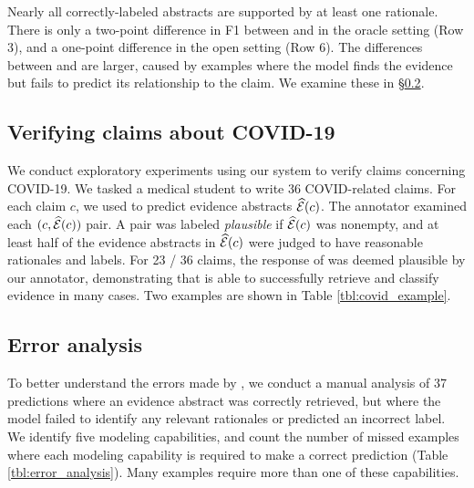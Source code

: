 Nearly all correctly-labeled abstracts are supported by at least one rationale. There is only a two-point difference in F1 between \abstractLabelOnly and \abstractLabelRationale in the oracle setting (Row 3), and a one-point difference in the open setting (Row 6). The differences between \sentenceSelectionOnly and \sentenceSelectionLabel are larger, caused by examples where the model finds the evidence but fails to predict its relationship to the claim. We examine these in \S\ref{sec:error_analysis}.




\subsection{Verifying claims about COVID-19} \label{sec:covid}
We conduct exploratory experiments using our system to verify claims concerning COVID-19. We tasked a medical student to write 36 COVID-related claims. For each claim $c$, we used \sysname to predict evidence abstracts $\widehat{{\mathcal{E}}}(c)$. The annotator examined each $(c, \widehat{{\mathcal{E}}}(c))$ pair. A pair was labeled \emph{plausible} if $\widehat{{\mathcal{E}}}(c)$ was nonempty, and at least half of the evidence abstracts in $\widehat{{\mathcal{E}}}(c)$ were judged to have reasonable rationales and labels. For 23 / 36 claims, the response of \sysname was deemed plausible by our annotator, demonstrating that \sysname is able to successfully retrieve and classify evidence in many cases. Two examples are shown in Table \ref{tbl:covid_example}.




\subsection{Error analysis} \label{sec:error_analysis}
To better understand the errors made by \sysname, we conduct a manual analysis of 37 predictions where an evidence abstract was correctly retrieved, but where the model failed to identify any relevant rationales or predicted an incorrect label. We identify five modeling capabilities, and count the number of missed examples where each modeling capability is required to make a correct prediction (Table \ref{tbl:error_analysis}). Many examples require more than one of these capabilities.


